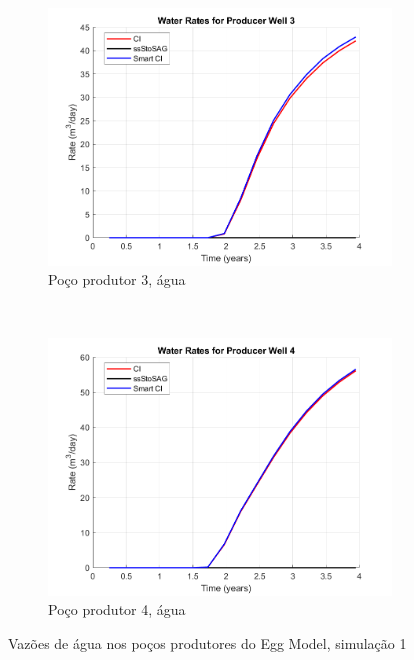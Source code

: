 \begin{figure}[!ht]
	\begin{subfigure}[b]{.3\textwidth}
		\includegraphics[width=\textwidth]{figs/resultadosEgg/imgsim1/EGG_WaterWell3_Zoom}
		\caption{Po\c{c}o produtor 3, \'{a}gua}
		\label{EGG1_WaterWell3}
	\end{subfigure}
	~
	\begin{subfigure}[b]{.3\textwidth}
		\includegraphics[width=\textwidth]{figs/resultadosEgg/imgsim1/EGG_WaterWell4_Zoom}
		\caption{Po\c{c}o produtor 4, \'{a}gua}
		\label{EGG1_WaterWell4}
	\end{subfigure}
\caption{Vaz\~{o}es de \'{a}gua nos po\c{c}os produtores do Egg Model, simula\c{c}\~{a}o 1}
\label{EGG1_WaterRates}
\end{figure}

